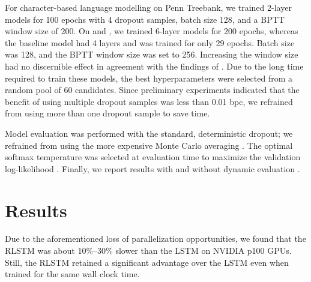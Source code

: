 For character-based language modelling on Penn Treebank, we trained 2-layer models for 100 epochs with 4 dropout samples, batch size 128, and a BPTT window size of 200.
On \enwik and \texteight \citep{hutter2012human}, we trained 6-layer models for 200 epochs, whereas the baseline model had 4 layers and was trained for only 29 epochs.
Batch size was 128, and the BPTT window size was set to 256.
Increasing the window size had no discernible effect in agreement with the findings of \citet{khandelwal2018sharp}.
Due to the long time required to train these models, the best hyperparameters were selected from a random pool of 60 candidates.
Since preliminary experiments indicated that the benefit of using multiple dropout samples was less than 0.01 bpc, we refrained from using more than one dropout sample to save time.

Model evaluation was performed with the standard, deterministic dropout; we refrained from using the more expensive Monte Carlo averaging \citep{gal2016theoretically}.
The optimal softmax temperature was selected at evaluation time to maximize the validation log-likelihood \citep{melis2018pushing}.
Finally, we report results with and without dynamic evaluation \citep{krause2017dynamic}.


\section{Results}

Due to the aforementioned loss of parallelization opportunities, we found that the RLSTM was about 10\%--30\% slower than the LSTM on NVIDIA p100 GPUs.
Still, the RLSTM retained a significant advantage over the LSTM even when trained for the same wall clock time.

